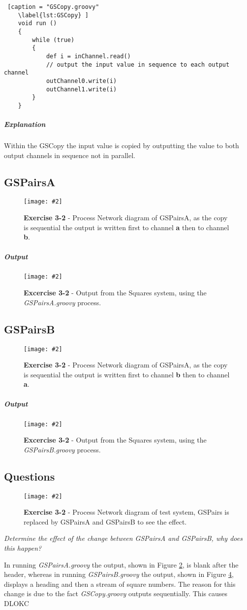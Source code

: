 \documentclass[10pt, a4paper]{article}
\newcommand{\figuremacro}[5]{
    \begin{figure}[#1]
        \centering
        \texttt{[image: \#2]}
        \caption[#3]{\textbf{#3}#4}
        \label{fig:#2}
    \end{figure}
}
\begin{document}
	\begin{lstlisting} [caption = "GSCopy.groovy"
	\label{lst:GSCopy} ]
	void run ()
	{
		while (true)
		{
			def i = inChannel.read()
			// output the input value in sequence to each output channel
			outChannel0.write(i)
			outChannel1.write(i)
		}
	} \end{lstlisting}
	
	\subparagraph{Explanation}
	
	Within the GSCopy the input value is copied by outputting the value to both output channels in sequence not in parallel.
	
	\subsection*{GSPairsA}

	\figuremacro{H}{GPairsAPN}{Exercise 3-2}{ - Process Network diagram of GSPairsA, as the copy is sequential the output is written first to channel \textbf{a} then to channel \textbf{b}.}{1.0}

	\subparagraph{Output} \hfill
	
	\figuremacro{H}{pairsAoutput}{Excercise 3-2}{ -  Output from the Squares system, using the \textit{GSPairsA.groovy} process.}{0.4}
	
	\subsection*{GSPairsB}
	
	\figuremacro{H}{GPairsBPN}{Exercise 3-2}{ - Process Network diagram of GSPairsA, as the copy is sequential the output is written first to channel \textbf{b} then to channel \textbf{a}.}{1.0}

	\subparagraph{Output} \hfill
		
	\figuremacro{H}{pairsBoutput}{Excercise 3-2}{ -  Output from the Squares system, using the \textit{GSPairsB.groovy} process.}{0.2}
	
	\subsection*{Questions}
	
	\figuremacro{H}{GSquaresPN}{Exercise 3-2}{ - Process Network diagram of test system, GSPairs is replaced by GSPairsA and GSPairsB to see the effect.}{1.0}
	
	\textit{Determine the effect of the change between GSPairsA and GSPairsB, why does this happen?}
	
	In running \textit{GSPairsA.groovy} the output, shown in Figure \ref{fig:pairsAoutput}, is blank after the header, whereas in running \textit{GSPairsB.groovy} the output, shown in Figure \ref{fig:pairsBoutput}, displays a heading and then a stream of square numbers. The reason for this change is due to the fact \textit{GSCopy.groovy} outputs sequentially. This causes DLOKC%
	
\end{document}
